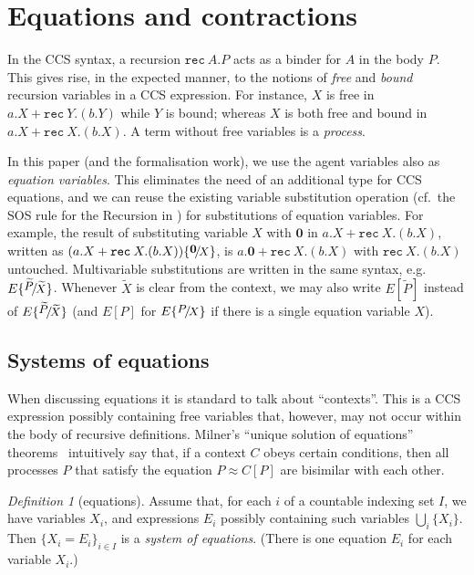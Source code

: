 \documentclass[GCNS]{yincog}
\theoremstyle{remark}
\newtheorem{definition}{Definition}[section]
\theoremstyle{theorem}
\theoremstyle{remark}
\newcommand{\Multivariate}{Multivariable\xspace}
\def\nil{{\boldsymbol 0}}
\def\sub#1#2{\{\raisebox{.5ex}{\small$#1$}\! / \!\mbox{\small$#2$}\}}
\newcommand{\ctvtex}[1]{ C \brac{#1} }
\newcommand{\brac}[1]{[#1] }
\renewcommand{\tilde}{\widetilde}
\newcommand{\recu}[2]{\mathtt{rec}\: #1 . #2}
\newcommand{\wbvtex}{\approx}
\newcommand{\til}{\tilde}
\begin{document}
\section{Equations and contractions}
 \label{s:eq}

In the CCS syntax, a recursion $\recu A P$ acts as a binder for $A$ in
the body $P$. This gives rise, in the expected manner, to the notions of
\emph{free} and \emph{bound} recursion variables in a CCS expression. For
instance, $X$ is free in $a.X + \recu Y (b.Y)$ while $Y$ is bound; whereas
$X$ is both free and bound in $a.X + \recu X (b.X)$. A term without free
variables is a \emph{process}.

In this paper (and the formalisation work), we use the agent variables
also as \emph{equation variables}. This eliminates the need of an additional
type for CCS equations, and we can reuse the existing variable substitution
operation (cf.~the SOS rule for the Recursion in ) for
substitutions of equation variables. For example, the result of substituting
variable $X$ with $\nil $ in $a.X + \recu X (b.X)$, written as
$(a.X + \recu X (b.X)) \sub {\nil} X$, is $a.\nil + \recu X (b.X)$ with
$\recu X (b.X)$ untouched. \Multivariate substitutions are written in the
same syntax, e.g. $E \sub {\til P} {\til X}$. Whenever $\til X$ is clear
from the context, we may also write $E[\til P]$ instead of
$E \sub {\til P} {\til X}$ (and $E[P]$ for $E \sub {P} X$ if there is a single
equation variable $X$).

\subsection{Systems of equations}
 \label{ss:SysEq}

When discussing equations it is standard to talk about ``contexts''. This
is a CCS expression possibly containing free variables that, however, may
not occur within the body of recursive definitions. Milner's ``unique solution
of equations'' theorems~\cite{Mil89} intuitively say that, if a context
$C$ obeys certain conditions, then all processes $P$ that satisfy the equation
$P \wbvtex \ctvtex P$ are bisimilar with each other.

\begin{definition}[equations]
 \label{def:equation}
Assume that, for each $i$ of a countable indexing set $I$, we have variables
$X_i$, and expressions $E_i$ possibly containing such variables
$\bigcup _i \{ X_i\}$. Then $\{ X_i = E_i\}_{i\in I}$ is a
\emph{system of equations}. (There is one equation $E_i$ for each variable
$X_i$.)
\end{definition}
\end{document}
